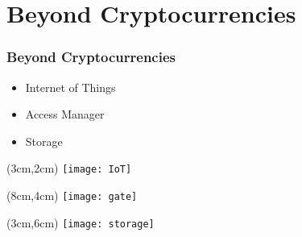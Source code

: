 \section{Beyond Cryptocurrencies}

\begin{frame}
 
 \frametitle{Beyond Cryptocurrencies}
 
 \begin{itemize}
  \item<1-> Internet of Things
  \item<2-> Access Manager
  \item<3-> Storage
 \end{itemize}
 
 
 \begin{textblock*}{5cm}(3cm,2cm)
  \texttt{[image: IoT]}
 \end{textblock*}
 
 \begin{textblock*}{5cm}(8cm,4cm)
  \texttt{[image: gate]}
 \end{textblock*}
 
 \begin{textblock*}{5cm}(3cm,6cm)
  \texttt{[image: storage]}
 \end{textblock*}

\end{frame}
